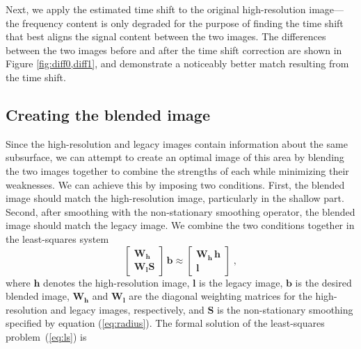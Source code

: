 Next, we apply the estimated time shift to the original high-resolution image---the frequency content is only degraded for the purpose of finding the time shift that best aligns the signal content between the two images.
The differences between the two images before and after the time shift correction are shown in Figure \ref{fig:diff0,diff1}, and demonstrate a noticeably better match resulting from the time shift.


\subsection{Creating the blended image}

Since the high-resolution and legacy images contain information about the same subsurface, we can attempt to create an optimal image of this area by blending the two images together to combine the strengths of each while minimizing their weaknesses.
We can achieve this by imposing two conditions.
First, the blended image should match the high-resolution image, particularly in the shallow part.
Second, after smoothing with the non-stationary smoothing operator, the blended image should match the legacy image.
We combine the two conditions together in the least-squares system
\begin{equation}
\label{eq:ls}
\left[\begin{array}{c} \mathbf{W_h} \\
        \mathbf{W_lS} \end{array}\right]\,\mathbf{b} \approx \left[\begin{array}{c} \mathbf{W_h\,h} \\
        \mathbf{l} \end{array}\right]\;,
\end{equation}
where $\mathbf{h}$ denotes the high-resolution image, $\mathbf{l}$ is the legacy image, $\mathbf{b}$ is the desired blended image, $\mathbf{W_h}$ and $\mathbf{W_l}$ are the diagonal weighting matrices for the high-resolution and legacy images, respectively, and $\mathbf{S}$ is the non-stationary smoothing specified by equation (\ref{eq:radius}).
The formal solution of the least-squares problem~(\ref{eq:ls}) is

